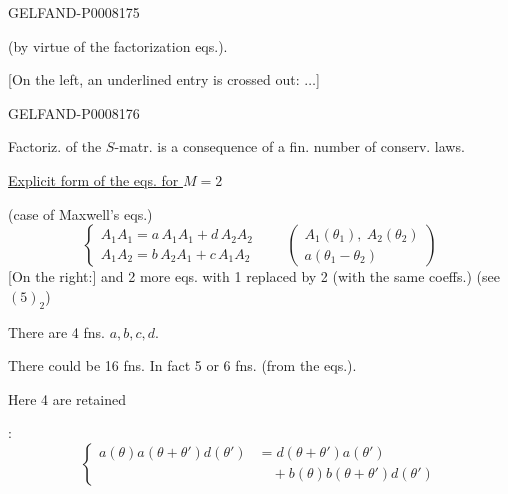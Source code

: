 \begin{GelfandAdjacentEvidence}{GELFAND-P000817}{5}


(by virtue of the factorization eqs.).

[On the left, an underlined entry is crossed out: \(\ldots\)]
\end{GelfandAdjacentEvidence}
\begin{GelfandAdjacentEvidence}{GELFAND-P000817}{6}


Factoriz. of the \(S\)-matr. is a consequence of a fin. number of conserv. laws.

\uline{Explicit form of the eqs. for \(M=2\)}

(case of Maxwell’s eqs.)
\begin{equation*}
\begin{cases}
A_1A_1=a\,A_1A_1+d\,A_2A_2\\
A_1A_2=b\,A_2A_1+c\,A_1A_2
\end{cases}
\qquad
\begin{pmatrix}
A_1(\theta_1),\ A_2(\theta_2)\\
a(\theta_1-\theta_2)
\end{pmatrix}\tag{5}
\end{equation*}
[On the right:] and 2 more eqs. with 1 replaced by 2
(with the same coeffs.)
(see \((5)_2\))

There are 4 fns. \(a,b,c,d\).

There could be 16 fns. In fact 5 or 6 fns. (from the eqs.).

Here 4 are retained

:
\begin{equation*}
\left\{
\begin{aligned}
a(\theta)a(\theta+\theta')d(\theta')
&=d(\theta+\theta')a(\theta')\\
&\quad +b(\theta)b(\theta+\theta')d(\theta')
\end{aligned}
\right.\tag{6}
\end{equation*}
\end{GelfandAdjacentEvidence}
